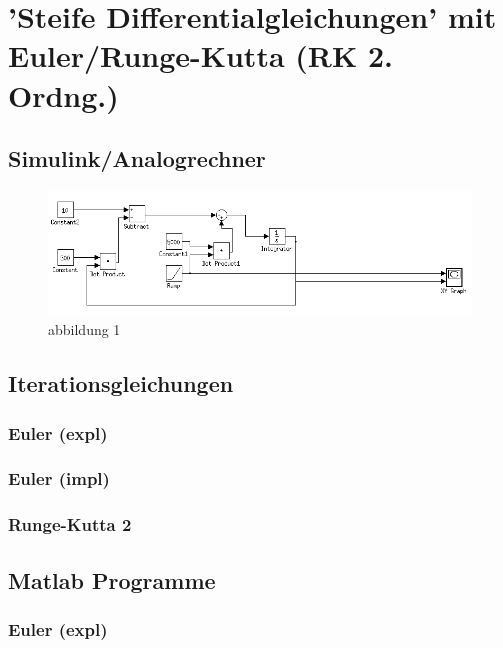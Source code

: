 \documentclass[10pt]{scrartcl}
\author{André Harms, Oliver Steenbuck}
\title{\titletext}
\date{02.11.2011}
\begin{document}
\maketitle

\setcounter{tocdepth}{3}
\tableofcontents

\section{'Steife Differentialgleichungen' mit Euler/Runge-Kutta (RK 2. Ordng.)}
	\subsection{Simulink/Analogrechner}
	
	\begin{figure}[htbp]
	\centering
		\includegraphics[scale=0.5]{simulink_aufg1_a}
	\caption{abbildung 1}
	\label{fig:abb1}
	\end{figure}

	\subsection{Iterationsgleichungen}
		\subsubsection{Euler (expl)}
		
		\subsubsection{Euler (impl)}
		
		\subsubsection{Runge-Kutta 2}
		
	\subsection{Matlab Programme}
		\subsubsection{Euler (expl)}
			
		
\end{document}
